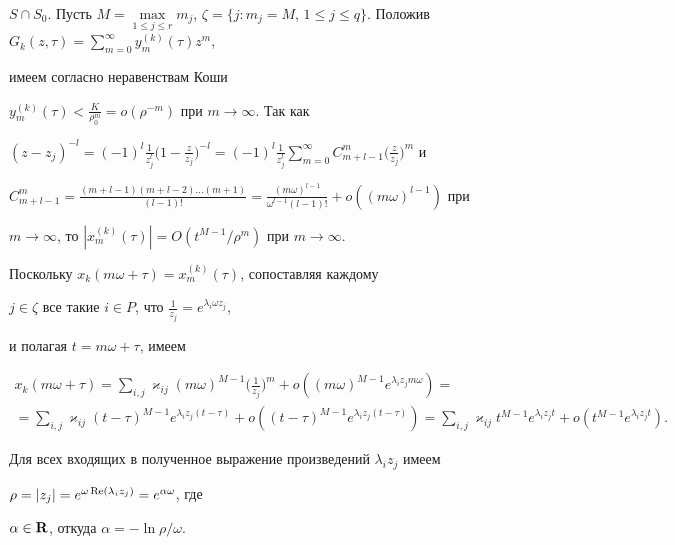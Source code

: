 $S\cap S_0$. Пусть $M=\max\limits_{1\le j\le r}m_j$, $\zeta=\{j:m_j=M$, $1\le 


j\le q\}$. Положив $G_k(z,\tau)= \sum\limits^\infty_{m=0}y^{(k)}_m(\tau)z^m$, 


имеем согласно неравенствам Коши 


$y^{(k)}_m(\tau)<\frac{K}{\rho^m_0}=o(\rho^{-m})$ при $m\to\infty$. Так как 


$(z-z_j)^{-l}= (-1)^l\frac{1}{z^l_j}\big( 


1-\frac{z}{z_j}\big)^{-l}=(-1)^l\frac{1}{z^l_j} \sum\limits^\infty_{m=0} 


C^m_{m+l-1}\big(\frac{z}{z_j}\big)^m$ и 


$C^m_{m+l-1}=\frac{(m+l-1)(m+l-2)\dotsc(m+1)}{(l-1)!}= 


\frac{(m\omega)^{l-1}}{\omega^{l-1}(l-1)!}+o((m\omega)^{l-1})$ при 


$m\to\infty$, то $|x^{(k)}_m(\tau)|=O(t^{M-1}/\rho^m)$ при $m\to\infty$. 


Поскольку $x_k(m\omega+\tau)=x^{(k)}_m(\tau)$, сопоставляя каждому 


$j\in\zeta$ все такие $i\in P$, что $\frac{1}{z_j}=e^{\lambda_i\omega z_j}$, 


и полагая $t=m\omega+\tau$, имеем 


\begin{gather*} 


x_k(m\omega+\tau)=\sum_{i,j}\varkappa_{ij}(m\omega)^{M-1} 


\bigg(\frac{1}{z_j} \bigg)^m+o((m\omega)^{M-1} 


e^{\lambda_i z_j m\omega})= \\ 


% 


=\sum_{i,j}\varkappa_{ij}(t-\tau)^{M-1} 


e^{\lambda_i z_j(t-\tau)}+o((t-\tau)^{M-1} 


e^{\lambda_i z_j(t-\tau)})=\sum_{i,j}\varkappa_{ij}t^{M-1} 


e^{\lambda_i z_j t}+o(t^{M-1}e^{\lambda_i z_j t}). 


\end{gather*} 


Для всех входящих в полученное выражение произведений $\lambda_i z_j$ имеем 


$\rho=|z_j|=e^{\omega\operatorname{Re}(\lambda_i z_j)}=e^{\alpha\omega}$, где 


$\alpha\in\bold R$, откуда $\alpha=-\ln\rho/\omega$. 



